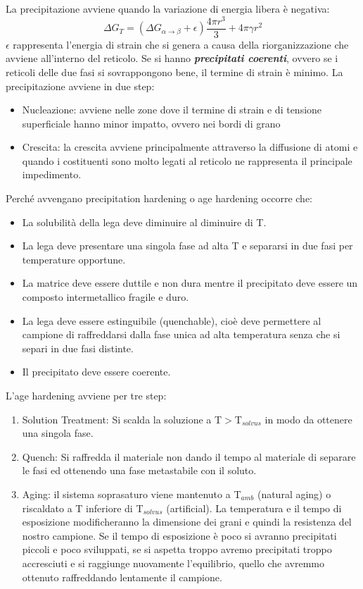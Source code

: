 La precipitazione avviene quando la variazione di energia libera è negativa:
\begin{equation}
    \Delta G_T=(\Delta G_{\alpha\rightarrow\beta}+\epsilon)\frac{4\pi r^3}{3}+4\pi \gamma r^2
\end{equation}
$\epsilon$ rappresenta l'energia di strain che si genera a causa della riorganizzazione che avviene all'interno del reticolo. Se si hanno \textbf{\textit{precipitati coerenti}}, ovvero se i reticoli delle due fasi si sovrappongono bene, il termine di strain è minimo. La precipitazione avviene in due step:
\begin{itemize}
    \item Nucleazione: avviene nelle zone dove il termine di strain e di tensione superficiale hanno minor impatto, ovvero nei bordi di grano 
    \item Crescita: la crescita avviene principalmente attraverso la diffusione di atomi e quando i costituenti sono molto legati al reticolo ne rappresenta il principale impedimento.
\end{itemize}
Perché avvengano precipitation hardening o age hardening occorre che:
\begin{itemize}
    \item La solubilità della lega deve diminuire al diminuire di T. 
    \item La lega deve presentare una singola fase ad alta T e separarsi in due fasi per temperature opportune.
    \item La matrice deve essere duttile e non dura mentre il precipitato deve essere un composto intermetallico fragile e duro.
    \item La lega deve essere estinguibile (quenchable), cioè deve permettere al campione di raffreddarsi dalla fase unica ad alta temperatura senza che si separi in due fasi distinte.  
    \item Il precipitato deve essere coerente.
\end{itemize}
L'age hardening avviene per tre step:
\begin{enumerate}
    \item Solution Treatment: Si scalda la soluzione a T$>$T$_{solvus}$ in modo da ottenere una singola fase.
    \item Quench: Si raffredda il materiale non dando il tempo al materiale di separare le fasi ed ottenendo una fase metastabile con il soluto.
    \item Aging: il sistema soprasaturo viene mantenuto a T$_{amb}$ (natural aging) o riscaldato a T inferiore di T$_{solvus}$ (artificial). La temperatura e il tempo di esposizione modificheranno la dimensione dei grani e quindi la resistenza del nostro campione. Se il tempo di esposizione è poco si avranno precipitati piccoli e poco sviluppati, se si aspetta troppo avremo precipitati troppo accresciuti e si raggiunge nuovamente l'equilibrio, quello che avremmo ottenuto raffreddando lentamente il campione.
\end{enumerate}

